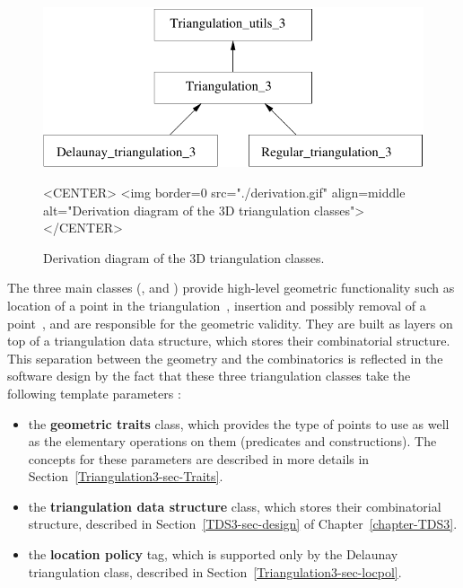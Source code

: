 \begin{figure}[htbp]
\begin{ccTexOnly}
\begin{center} 
\includegraphics{Triangulation_3/derivation} 
\end{center}
\end{ccTexOnly}
\begin{ccHtmlOnly}
<CENTER>
<img border=0 src="./derivation.gif" align=middle
alt="Derivation diagram of the 3D triangulation classes"> 
</CENTER>
\end{ccHtmlOnly}
\caption{Derivation diagram of the 3D triangulation classes.
\label{t3_derivation}}
\end{figure} 

The three main classes (, 
and ) provide high-level geometric functionality
such as location of a point in the triangulation~\cite{cgal:dpt-wt-02}, insertion
and possibly removal of a point~\cite{cgal:dt-pvr3d-03}, and are responsible for the
geometric validity.  They are built as layers on top of a triangulation data
structure, which stores their combinatorial structure.  This separation between
the geometry and the combinatorics is reflected in the software design by the
fact that these three triangulation classes take the following template parameters :

\begin{itemize}
\item {} the \textbf{geometric traits} class, which provides the type of points
to use as well as the elementary operations on them (predicates and
constructions).  The concepts for these parameters are described in more
details in Section~\ref{Triangulation3-sec-Traits}.
\item {} the \textbf{triangulation data structure} class, which stores their
combinatorial structure, described in Section~\ref{TDS3-sec-design} of
Chapter~\ref{chapter-TDS3}.
\item {} the \textbf{location policy} tag, which is supported only by the Delaunay
triangulation class, described in Section~\ref{Triangulation3-sec-locpol}.
\end{itemize}


